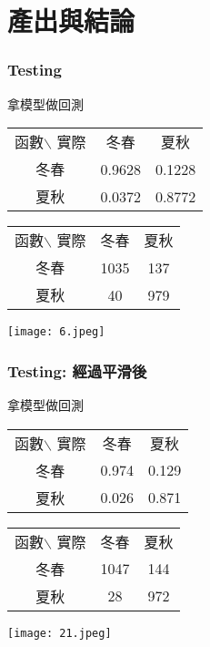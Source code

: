 \documentclass{beamer}
\begin{document}
\section{產出與結論}
\begin{frame}
\frametitle{Testing}
拿模型做回測\\
\begin{center}
\begin{tabular}{ccc}
函數$\backslash$ 實際 & 冬春& 夏秋\\
冬春 &0.9628 &0.1228 \\
夏秋 &0.0372 &0.8772 \\
\end{tabular}
\begin{tabular}{ccc}
函數$\backslash$ 實際 & 冬春& 夏秋\\
冬春 &1035 &137 \\
夏秋 &40 &979 \\
\end{tabular}
\end{center}
\begin{center}
\texttt{[image: 6.jpeg]}
\end{center}
\end{frame}

\begin{frame}
\frametitle{Testing: 經過平滑後}
拿模型做回測\\
\begin{center}
\begin{tabular}{ccc}
函數$\backslash$ 實際 & 冬春& 夏秋\\
冬春 &0.974 &0.129 \\
夏秋 &0.026 &0.871 \\
\end{tabular}
\begin{tabular}{ccc}
函數$\backslash$ 實際 & 冬春& 夏秋\\
冬春 &1047 &144 \\
夏秋 &28 &972 \\
\end{tabular}
\end{center}
\begin{center}
\texttt{[image: 21.jpeg]}
\end{center}
\end{frame}
\end{document}
